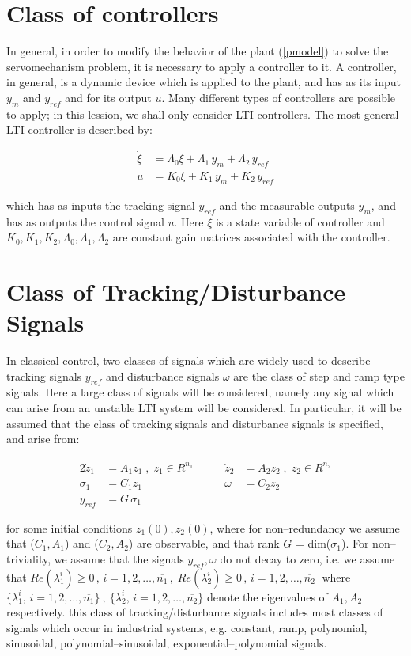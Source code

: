 \documentclass[a4paper]{article}
\theoremstyle{plain} %
{\theorembodyfont{\normalfont}
\newtheorem{Exa}{Example}}
\def\td{tracking/disturbance }
\begin{document}
\section{Class of controllers}
In general, in order to modify the behavior of the plant
(\ref{pmodel}) to solve the servomechanism problem, it is
necessary to apply a controller to it. A controller, in general,
is a dynamic device which is applied to the plant, and has as its
input $y_m$ and $y_{ref}$ and for its output $u$. Many different
types of controllers are possible to apply; in this lession, we
shall only consider LTI controllers. The most general LTI
controller is described by:

\begin{align}\label{class-ctr}
 \dot{\xi} &= {\Lambda}_{0}\xi + {\Lambda}_1 \, y_m + {\Lambda}_2
 \, y_{ref} \\
 u &= K_0 \xi + K_1 \, y_m + K_2 \, y_{ref} \nonumber
\end{align}

which has as inputs the tracking signal $y_{ref}$ and the
measurable outputs $y_m$, and has as outputs the control signal
$u$. Here $\xi$ is a state variable of controller and
$K_0,K_1,K_2,\Lambda_0,\Lambda_1,\Lambda_2$ are constant gain
matrices associated with the controller.

\section{Class of Tracking/Disturbance Signals}
In classical control, two classes of signals which are widely used
to describe tracking signals $y_{ref}$ and disturbance signals
$\omega$ are the class of step and ramp type signals. Here a large
class of signals will be considered, namely any signal which can
arise from an unstable LTI system will be considered. In
particular, it will be assumed that the class of tracking signals
and disturbance signals is specified, and arise from:

\begin{alignat}{2}\label{class-tds}
\dot{z}_1 &= A_1 z_1 \;,\; z_1 \in R^{\overline{n_1}} &\qquad %
\dot{z}_2 &= A_2 z_2 \;,\; z_2 \in R^{\overline{n_2}} \nonumber \\%
\sigma_1 &= C_1 z_1  &\qquad
\omega &= C_2 z_2 \\%
y_{ref} &= G \, \sigma_1 \nonumber %
\end{alignat}

for some initial conditions $z_1(0), z_2(0)$, where for
non--redundancy we assume that ($C_1, A_1$) and ($C_2, A_2$) are
observable, and that rank $G$ = dim($\sigma_1$). For
non--triviality, we assume that the signals $y_{ref}, \omega$ do
not decay to zero, i.e. we assume that $Re(\lambda_{1}^i)\geq 0 \,
, \,i=1,2,\ldots,\overline{n_1} \, , \; Re(\lambda_{2}^i)\geq 0 \,
, \, i=1,2,\ldots,\overline{n_2} \;$ where $\{ \lambda_{1}^i,\,
i=1,2,\ldots, \overline{n_1} \} \:,\: \{ \lambda_{2}^i,
\,i=1,2,\ldots, \overline{n_2} \}$ denote the eigenvalues of $A_1,
A_2$ respectively. this class of \td signals includes most classes
of signals which occur in industrial systems, e.g. constant, ramp,
polynomial, sinusoidal, polynomial--sinusoidal,
exponential--polynomial signals.\\
\end{document}
